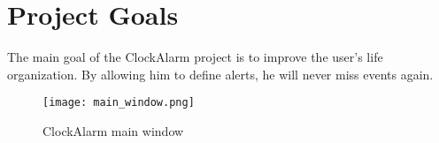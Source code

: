 \section{Project Goals}

The main goal of the ClockAlarm project is to improve the user's life
organization. By allowing him to define alerts, he will never miss events
again.

\begin{figure}[h]
    \centering
    \caption{ClockAlarm main window}
    \texttt{[image: main\_window.png]}
\end{figure}

